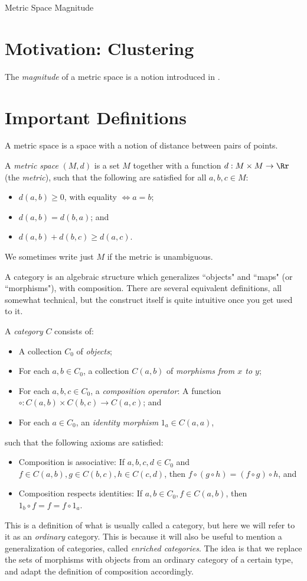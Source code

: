 \documentclass[12pt]{pom_thesis}
\begin{document}
\begin{chapter}{Metric Space Magnitude}
\section{Motivation: Clustering}
The \emph{magnitude} of a metric space is a notion introduced in \cite{Lein2}. %
\section{Important Definitions} \label{mag_defs}
A metric space is a space with a notion of distance between pairs of points. 
\begin{defn}
A \textit{metric space} $(M,d)$ is a set $M$ together with a function  $d:M \times M \rightarrow \Rr$ (the \emph{metric}), such that the following are satisfied for all $a,b,c \in M$:
\begin{itemize}
\item $d(a,b) \geq 0$, with equality $\iff a = b$;
\item $d(a,b) = d(b,a)$; and
\item $d(a,b) + d(b,c) \geq d(a,c)$.
\end{itemize}
We sometimes write just $M$ if the metric is unambiguous.
\end{defn}
A category is an algebraic structure which generalizes ``objects" and ``maps" (or ``morphisms"), with composition. There are several equivalent definitions, all somewhat technical, but the construct itself is quite intuitive once you get used to it.  
\begin{defn}
A \textit{category} $C$ consists of:
\begin{itemize}
\item A collection $C_0$ of \emph{objects};
\item For each $a,b \in C_0$, a collection $C(a,b)$ of \emph{morphisms from $x$ to $y$};
\item For each $a,b,c \in C_0$, a \emph{composition operator}: A function $\circ:C(a,b) \times C(b,c) \rightarrow C(a,c)$; and
\item For each $a \in C_0$, an \emph{identity morphism} $1_a \in C(a,a)$,
\end{itemize}
such that the following axioms are satisfied:
\begin{itemize}
\item Composition is associative: If $a,b,c,d \in C_0$ and $f\in C(a,b), g \in C(b,c), h \in C(c,d)$, then $f \circ (g \circ h) = (f \circ g) \circ h$, and
\item Composition respects identities: If $a,b \in C_0, f \in C(a,b)$, then $1_b \circ f = f = f \circ 1_a$.
\end{itemize}
\end{defn}
This is a definition of what is usually called a category, but here we will refer to it as an \emph{ordinary} category. This is because it will also be useful to mention a generalization of categories, called \emph{enriched categories}. The idea is that we replace the sets of morphisms with objects from an ordinary category of a certain type, and adapt the definition of composition accordingly. 


\end{chapter}
\end{document}
